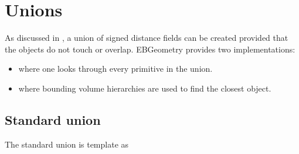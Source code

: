 \documentclass[letterpaper,10pt,english]{sphinxmanual}
\begin{document}
\sphinxstepscope


\section{Unions}
\label{\detokenize{ImplemUnion:unions}}\label{\detokenize{ImplemUnion:chap-union}}\label{\detokenize{ImplemUnion::doc}}
\sphinxAtStartPar
As discussed in {\hyperref[\detokenize{Concepts:chap-concepts}]{}}, a union of signed distance fields can be created provided that the objects do not touch or overlap.
EBGeometry provides two implementations:
\begin{itemize}
\item {} 
\sphinxAtStartPar
{} where one looks through every primitive in the union.

\item {} 
\sphinxAtStartPar
{} where bounding volume hierarchies are used to find the closest object.

\end{itemize}


\subsection{Standard union}
\label{\detokenize{ImplemUnion:standard-union}}
\sphinxAtStartPar
The standard union is template as
\end{document}
